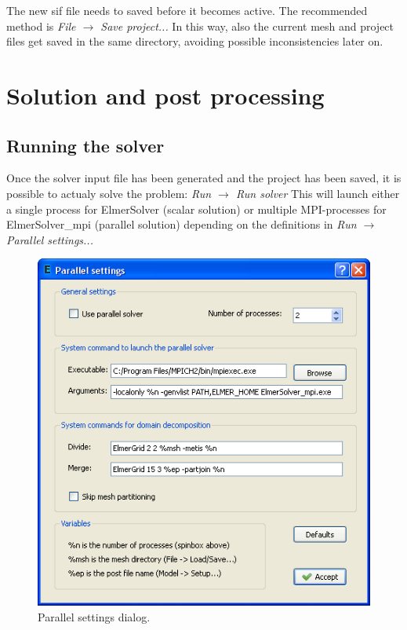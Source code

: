 \documentclass[a4paper,12pt]{article}
\newcommand{\menu}[2]{{\it \vskip2mm #1 $\rightarrow$ #2 \vskip2mm}}
\begin{document}
The new sif file needs to saved before it becomes active. The recommended
method is
\menu{File}{Save project...}
\noindent In this way, also the current mesh and project files get saved in the
same directory, avoiding possible inconsistencies later on.

\section{Solution and post processing}

\subsection{Running the solver}

Once the solver input file has been generated and the project has been saved,
it is possible to actualy solve the problem:
\menu{Run}{Run solver}
\noindent This will launch either a single process for ElmerSolver (scalar solution)
or multiple MPI-processes for ElmerSolver\_mpi (parallel solution) depending on the
definitions in
\menu{Run}{Parallel settings...}

\begin{figure}[ht]
\begin{center}
 \includegraphics[scale=0.5]{images/parallelsettings.png}
\caption{Parallel settings dialog.}
\end{center}
\end{figure}
\end{document}
